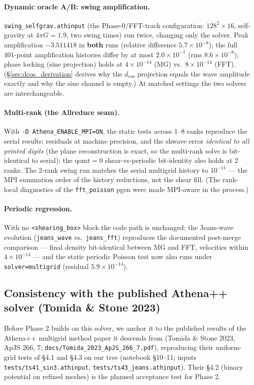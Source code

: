 \documentclass[11pt]{article}
\newcommand{\code}[1]{\texttt{#1}}
\begin{document}
\paragraph{Dynamic oracle A/B: swing amplification.}
\code{swing\_selfgrav.athinput} (the Phase-0/FFT-track configuration:
$128^2\times16$, self-gravity at $4\pi G = 1.9$, two swing times) run twice,
changing only the solver. Peak amplification $-3.511418$ in \textbf{both} runs
(relative difference $5.7\times10^{-8}$); the full 401-point amplification
histories differ by at most $2.0\times10^{-7}$ (rms $8.6\times10^{-8}$); phase
locking (sine projection) holds at $4\times10^{-14}$ (MG) vs.\ $8\times10^{-14}$
(FFT). (\S\ref{sec:dcos_derivation} derives why the $d_{\cos}$ projection
equals the wave amplitude exactly and why the sine channel is empty.) At matched settings the two solvers are interchangeable.

\paragraph{Multi-rank (the Allreduce seam).}
With \code{-D Athena\_ENABLE\_MPI=ON}, the static tests across 1--8 ranks reproduce
the serial results: residuals at machine precision, and the shwave error
\emph{identical to all printed digits} (the plane reconstruction is exact, so the
multi-rank solve is bit-identical to serial); the $\mathrm{qomt}=0$
shear-vs-periodic bit-identity also holds at 2 ranks. The 2-rank swing run matches
the serial multigrid history to $10^{-11}$ --- the MPI summation order of the
history reductions, not the shear fill. (The rank-local diagnostics of the
\code{fft\_poisson} pgen were made MPI-aware in the process.)

\paragraph{Periodic regression.}
With no \code{<shearing\_box>} block the code path is unchanged: the Jeans-wave
evolution (\code{jeans\_wave} vs.\ \code{jeans\_fft}) reproduces the documented
post-merge comparison --- final density bit-identical between MG and FFT,
velocities within $4\times10^{-14}$ --- and the static periodic Poisson test now
also runs under \code{solver=multigrid} (residual $5.9\times10^{-14}$).

\subsection{Consistency with the published Athena++ solver (Tomida \& Stone 2023)}
\label{sec:ts_tests}
Before Phase 2 builds on this solver, we anchor it to the published results of the
Athena++ multigrid method paper it descends from (Tomida \& Stone 2023, ApJS 266, 7;
\code{docs/Tomida\_2023\_ApJS\_266\_7.pdf}), reproducing their uniform-grid tests of
\S4.1 and \S4.3 on our tree (notebook \S10--11; inputs
\code{tests/ts41\_sin3.athinput}, \code{tests/ts43\_jeans.athinput}). Their \S4.2
(binary potential on refined meshes) is the planned acceptance test for Phase 2.
\end{document}
